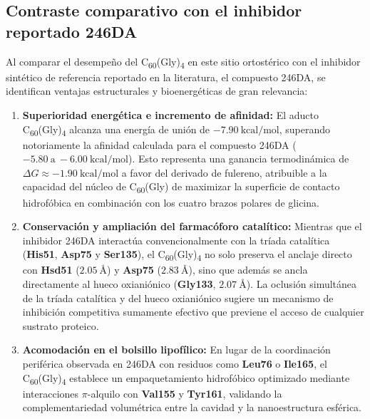 \subsection{Contraste comparativo con el inhibidor reportado 246DA}

Al comparar el desempeño del C\textsubscript{60}(Gly)\textsubscript{4} en este sitio ortostérico con el inhibidor sintético de referencia reportado en la literatura, el compuesto 246DA, se identifican ventajas estructurales y bioenergéticas de gran relevancia:

\begin{enumerate}
    \item \textbf{Superioridad energética e incremento de afinidad:} El aducto C\textsubscript{60}(Gly)\textsubscript{4} alcanza una energía de unión de $-7.90\ \text{kcal/mol}$, superando notoriamente la afinidad calculada para el compuesto 246DA ($-5.80\ \text{a}\ -6.00\ \text{kcal/mol}$). Esto representa una ganancia termodinámica de $\Delta G \approx -1.90\ \text{kcal/mol}$ a favor del derivado de fulereno, atribuible a la capacidad del núcleo de C\textsubscript{60}(Gly) de maximizar la superficie de contacto hidrofóbica en combinación con los cuatro brazos polares de glicina.
    
    \item \textbf{Conservación y ampliación del farmacóforo catalítico:} Mientras que el inhibidor 246DA interactúa convencionalmente con la tríada catalítica (\textbf{His51}, \textbf{Asp75} y \textbf{Ser135}), el C\textsubscript{60}(Gly)\textsubscript{4} no solo preserva el anclaje directo con \textbf{Hsd51} ($2.05\ \text{\AA}$) y \textbf{Asp75} ($2.83\ \text{\AA}$), sino que además se ancla directamente al hueco oxianiónico (\textbf{Gly133}, $2.07\ \text{\AA}$). La oclusión simultánea de la tríada catalítica y del hueco oxianiónico sugiere un mecanismo de inhibición competitiva sumamente efectivo que previene el acceso de cualquier sustrato proteico.
    
    \item \textbf{Acomodación en el bolsillo lipofílico:} En lugar de la coordinación periférica observada en 246DA con residuos como \textbf{Leu76} o \textbf{Ile165}, el C\textsubscript{60}(Gly)\textsubscript{4} establece un empaquetamiento hidrofóbico optimizado mediante interacciones $\pi$-alquilo con \textbf{Val155} y \textbf{Tyr161}, validando la complementariedad volumétrica entre la cavidad y la nanoestructura esférica.
\end{enumerate}

